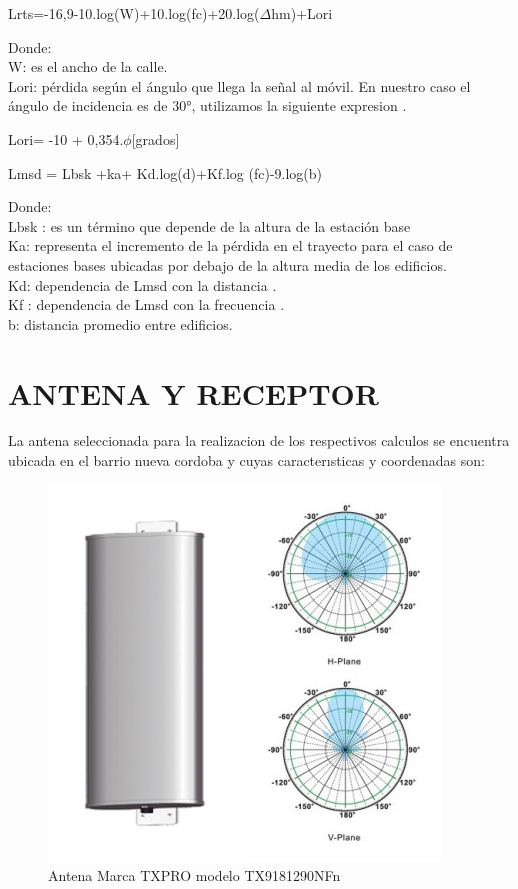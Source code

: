 \documentclass[conference, 9pt, a4paper]{IEEEtran}
\begin{document}
\begin{center}
Lrts=-16,9-10.log(W)+10.log(fc)+20.log($\Delta $hm)+Lori
\end{center}
Donde:\\
W: es el ancho de la calle.\\
Lori: pérdida según el ángulo que llega la señal al móvil.
En nuestro caso el ángulo de incidencia es de  30°, utilizamos la siguiente expresion .\\
\begin{center}
Lori= -10 + 0,354.$\phi$[grados]
\end{center}
\begin{center}
Lmsd = Lbsk +ka+ Kd.log(d)+Kf.log (fc)-9.log(b)
\end{center}
Donde:\\
Lbsk : es un término que depende de la altura de la estación
base\\
Ka: representa el incremento de la pérdida en el trayecto
para el caso de estaciones bases ubicadas por debajo de la
altura media de los edificios.\\
Kd: dependencia de Lmsd con la distancia .\\
Kf : dependencia de Lmsd con la frecuencia . \\ 
b:  distancia promedio entre edificios. \\


\section{ANTENA Y RECEPTOR}
La antena seleccionada para la realizacion de los respectivos
calculos se encuentra ubicada en el barrio nueva cordoba y cuyas caracterısticas y coordenadas son: 



\begin{figure}
	\centering
	\includegraphics[width=\columnwidth]{image/ANTENA.PNG}
	\caption{ Antena  Marca TXPRO modelo TX9181290NFn}
\end{figure}
\end{document}
